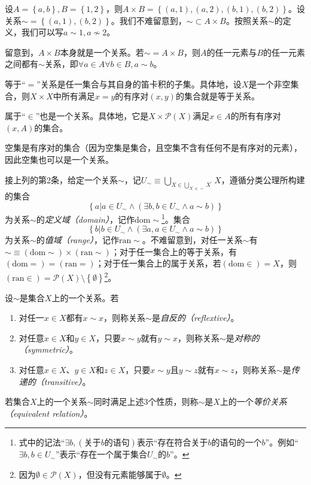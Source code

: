 \documentclass[../main.tex]{subfiles}
\begin{document}
\begin{example}
设$A=\left\{a,b\right\}, B=\left\{1,2\right\}$，则$A\times B=\left\{\left(a,1\right),\left(a,2\right),\left(b,1\right),\left(b,2\right)\right\}$。设关系$\sim=\left\{\left(a,1\right),\left(b,2\right)\right\}$。我们不难留意到，$\sim\subset A\times B$。按照关系$\sim$的定义，我们可以写$a\sim 1,a\not\sim 2$。

留意到，$A\times B$本身就是一个关系。若$\sim=A\times B$，则$A$的任一元素与$B$的任一元素之间都有$\sim$关系，即$\forall a\in A\forall b\in B,a\sim b$。

等于“$=$”关系是任一集合与其自身的笛卡积的子集。具体地，设$X$是一个非空集合，则$X\times X$中所有满足$x=y$的有序对$\left(x,y\right)$的集合就是等于关系。

属于“$\in$”也是一个关系。具体地，它是$X\times\mathcal{P}\left(X\right)$满足$x\in A$的所有有序对$\left(x,A\right)$的集合。

空集是有序对的集合（因为空集是集合，且空集不含有任何不是有序对的元素），因此空集也可以是一个关系。
\end{example}

接上列的第2条，给定一个关系$\sim$，记$U_\sim\equiv\bigcup_{X\in\bigcup_{X^\prime\in\sim}X^\prime}X$，遵循分类公理所构建的集合
\[
\left\{a|a\in U_\sim\wedge\left(\exists b,b\in U_\sim\wedge a\sim b\right)\right\}
\]
为关系$\sim$的\emph{定义域（domain）}，记作$\mathrm{dom}\sim$\footnote{式中的记法“$\exists b,\left(\text{关于$b$的语句}\right)$表示“存在符合关于$b$的语句的一个$b$”。例如“$\exists b,b\in U_\sim$”表示“存在一个属于集合$U_\sim$的$b$”。}。集合
\[
\left\{b|b\in U_\sim\wedge \left(\exists a,a\in U_\sim\wedge a\sim b\right)\right\}
\]
为关系$\sim$的\emph{值域（range）}，记作$\mathrm{ran}\sim$。不难留意到，对任一关系$\sim$有$\sim\equiv\left(\mathrm{dom}\sim\right)\times\left(\mathrm{ran}\sim\right)$；对于任一集合上的等于关系，有$\left(\mathrm{dom}=\right)=\left(\mathrm{ran}=\right)$；对于任一集合上的属于关系，若$\left(\mathrm{dom}\in\right)=X$，则$\left(\mathrm{ran}\in\right)=\mathcal{P}\left(X\right)\setminus\left\{\emptyset\right\}$\footnote{因为$\emptyset\in\mathcal{P}\left(X\right)$，但没有元素能够属于$\emptyset$。}。

设$\sim$是集合$X$上的一个关系。若
\begin{enumerate}
    \item 对任一$x\in X$都有$x\sim x$，则称关系$\sim$是\emph{自反的（reflextive）}。
    \item 对任意$x\in X$和$y\in X$，只要$x\sim y$就有$y\sim x$，则称关系$\sim$是\emph{对称的（symmetric）}。
    \item 对任意$x\in X$、$y\in X$和$z\in X$，只要$x\sim y\text{且}y\sim z$就有$x\sim z$，则称关系$\sim$是\emph{传递的（transitive）}。
\end{enumerate}
若集合$X$上的一个关系$\sim$同时满足上述3个性质，则称$\sim$是$X$上的一个\emph{等价关系（equivalent relation）}。
\end{document}
